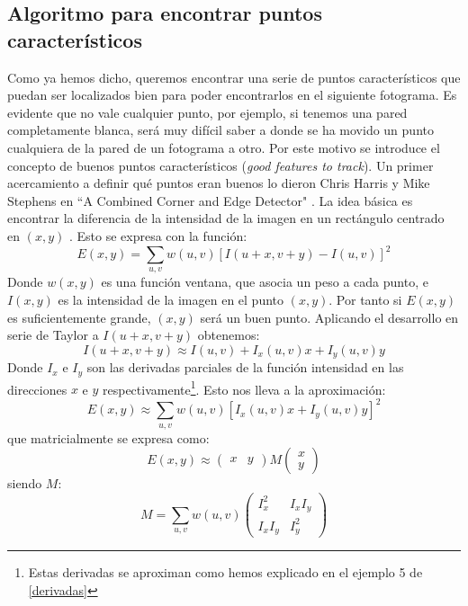 \documentclass[a4paper,openright, 12pt]{book}
\begin{document}
\subsection{Algoritmo para encontrar puntos característicos}

Como ya hemos dicho, queremos encontrar una serie de puntos característicos que puedan ser localizados bien para poder encontrarlos en el siguiente fotograma. Es evidente que no vale cualquier punto, por ejemplo, si tenemos una pared completamente blanca, será muy difícil saber a donde se ha movido un punto cualquiera de la pared de un fotograma a otro. Por este motivo se introduce el concepto de buenos puntos característicos
(\textit{good features to track}).
Un primer acercamiento a definir qué puntos eran buenos lo dieron Chris Harris y Mike Stephens en ``A Combined Corner and Edge Detector" \cite{harris88}.
La idea básica es encontrar la diferencia de la intensidad de la imagen en un rectángulo centrado en $(x,y)$ . Esto se expresa con la función:
\begin{equation}
E(x,y)= \sum_{u,v} w(u,v) [I(u+x,v+y)-I(u,v)]^2
\end{equation}
Donde $w(x,y)$ es una función ventana, que asocia un peso a cada punto, e $I(x,y)$ es la intensidad de la imagen en el punto $(x,y)$.
Por tanto si $E(x,y)$ es suficientemente grande, $(x,y)$ será un buen punto.
Aplicando el desarrollo en serie de Taylor a $I(u+x,v+y)$ obtenemos:
\begin{equation}
I(u+x,v+y) \approx I(u, v) + I_x(u,v)x + I_y(u,v)y
\end{equation}
Donde $I_x$ e $I_y$ son las derivadas parciales de la función intensidad en las direcciones $x$ e $y$ respectivamente\footnote{Estas derivadas se aproximan como hemos explicado en el ejemplo 5 de \ref{derivadas} }.
Esto nos lleva a la aproximación:
\begin{equation*}
E(x,y) \approx \sum_{u,v} w(u,v)[I_x(u,v)x + I_y(u,v)y]^2
\end{equation*}
que matricialmente se expresa como:
\begin{equation}
E(x,y) \approx 
\left( \begin{array}{cc}x & y \end{array} \right)
M 
\left( \begin{array}{c}x\\y \end{array} \right)
\end{equation}
siendo $M$:
\begin{equation*}
M = \sum_{u,v}w(u,v)
\left( \begin{array}{cc}
I_x^2 & I_xI_y\\
I_xI_y & I_y^2
 \end{array} \right)
\end{equation*}
\end{document}
